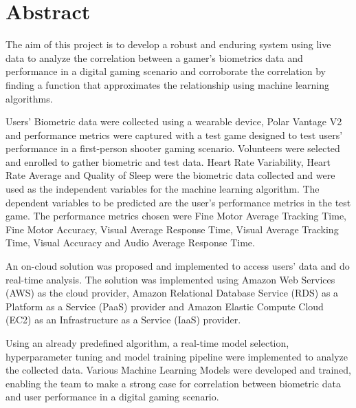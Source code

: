 \chapter{Abstract}
The aim of this project is to develop a robust and enduring system using live data to analyze the correlation between a gamer's 
biometrics data and performance in a digital gaming scenario and corroborate the correlation by finding a function that approximates the relationship 
using machine learning algorithms.

Users' Biometric data were collected using a wearable device, Polar Vantage V2 and performance metrics were captured 
with a test game designed to test users' performance in a first-person shooter gaming scenario. Volunteers were selected and enrolled to gather biometric 
and test data. Heart Rate Variability, Heart Rate Average and Quality of Sleep were the biometric data collected and were used as the independent 
variables for the machine learning algorithm. The dependent variables to be predicted are the user's performance metrics in the test game. 
The performance metrics chosen were Fine Motor Average Tracking Time, Fine Motor Accuracy, Visual Average Response Time, Visual Average Tracking Time,
Visual Accuracy and Audio Average Response Time.

An on-cloud solution was proposed and implemented to access users' data and do real-time analysis. The solution was implemented using Amazon Web Services (AWS)
as the cloud provider, Amazon Relational Database Service (RDS) as a Platform as a Service (PaaS) provider and Amazon Elastic Compute Cloud (EC2) as an
Infrastructure as a Service (IaaS) provider.

Using an already predefined algorithm, a real-time model selection, hyperparameter tuning and model training pipeline were implemented to analyze the collected 
data. Various Machine Learning Models were developed and trained, enabling the team to make a strong case for correlation 
between biometric data and user performance in a digital gaming scenario. 
